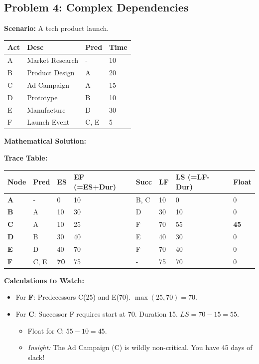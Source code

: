 \documentclass[
  letterpaper,
  DIV=11,
  numbers=noendperiod]{scrreprt}
\providecommand{\tightlist}{%
  \setlength{\itemsep}{0pt}\setlength{\parskip}{0pt}}
\begin{document}
\subsection{Problem 4: Complex
Dependencies}\label{problem-4-complex-dependencies}

\textbf{Scenario:} A tech product launch.

\begin{longtable}[]{@{}llll@{}}
\toprule\noalign{}
Act & Desc & Pred & Time \\
\midrule\noalign{}
\endhead
\bottomrule\noalign{}
\endlastfoot
A & Market Research & - & 10 \\
B & Product Design & A & 20 \\
C & Ad Campaign & A & 15 \\
D & Prototype & B & 10 \\
E & Manufacture & D & 30 \\
F & Launch Event & C, E & 5 \\
\end{longtable}

\textbf{Mathematical Solution:}

\textbf{Trace Table:}

\begin{longtable}[]{@{}llllllll@{}}
\toprule\noalign{}
Node & Pred & ES & EF (=ES+Dur) & Succ & LF & LS (=LF-Dur) & Float \\
\midrule\noalign{}
\endhead
\bottomrule\noalign{}
\endlastfoot
\textbf{A} & - & 0 & 10 & B, C & 10 & 0 & 0 \\
\textbf{B} & A & 10 & 30 & D & 30 & 10 & 0 \\
\textbf{C} & A & 10 & 25 & F & 70 & 55 & \textbf{45} \\
\textbf{D} & B & 30 & 40 & E & 40 & 30 & 0 \\
\textbf{E} & D & 40 & 70 & F & 70 & 40 & 0 \\
\textbf{F} & C, E & \textbf{70} & 75 & - & 75 & 70 & 0 \\
\end{longtable}

\textbf{Calculations to Watch:}

\begin{itemize}
\item
  For \textbf{F}: Predecessors C(25) and E(70). \(\max(25, 70) = 70\).
\item
  For \textbf{C}: Successor F requires start at 70. Duration 15.
  \(LS = 70-15 = 55\).

  \begin{itemize}
  \tightlist
  \item
    Float for C: \(55 - 10 = 45\).
  \item
    \emph{Insight:} The Ad Campaign (C) is wildly non-critical. You have
    45 days of slack!
  \end{itemize}
\end{itemize}
\end{document}
